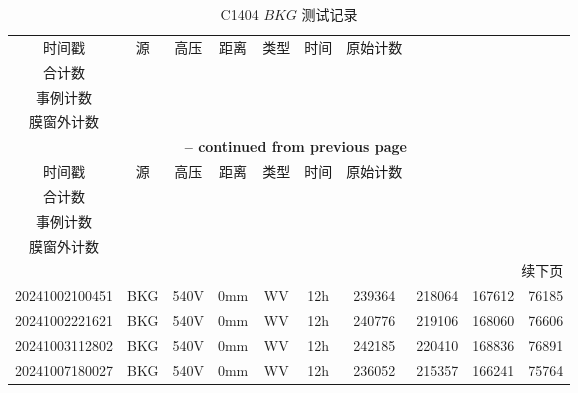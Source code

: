 \begin{center}
{ \tabcolsep=3pt
\begin{longtable}{c c c c c c c c c c}
    \caption{C1404 $BKG$ 测试记录}
    \label{tab:oct_C1404_BKG} \\
    \toprule
    时间戳  &   源  &   高压    &   距离    &   类型    &   时间    &   原始计数    &   \makecell[c]{去除反符\\合计数}  &   \makecell[c]{去除单维\\事例计数}    &   \makecell[c]{去除短径迹\& \\ 膜窗外计数}  \\
    \midrule
    \endfirsthead

    \multicolumn{10}{c}{{\bfseries \tablename\ \thetable{} -- continued from previous page}} \\
    \toprule
    时间戳  &   源  &   高压    &   距离    &   类型    &   时间    &   原始计数    &   \makecell[c]{去除反符\\合计数}  &   \makecell[c]{去除单维\\事例计数}    &   \makecell[c]{去除短径迹\& \\ 膜窗外计数}  \\
    \midrule
    \endhead

    \bottomrule
    \multicolumn{10}{r}{续下页}
    \endfoot

    \bottomrule
    \endlastfoot

    20241001124311 & BKG & 540V & 0mm & WV & 12h & 236264 & 215416 & 166004 & 75955 \\
    20241002100451 & BKG & 540V & 0mm & WV & 12h & 239364 & 218064 & 167612 & 76185 \\
    20241002221621 & BKG & 540V & 0mm & WV & 12h & 240776 & 219106 & 168060 & 76606 \\
    20241003112802 & BKG & 540V & 0mm & WV & 12h & 242185 & 220410 & 168836 & 76891 \\
    20241007180027 & BKG & 540V & 0mm & WV & 12h & 236052 & 215357 & 166241 & 75764 \\

\end{longtable}
}
\end{center}

